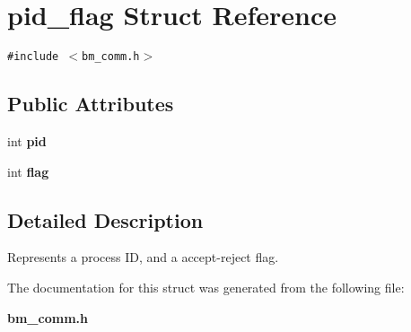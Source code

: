 \section{pid\_\-flag Struct Reference}
\label{structpid__flag}
{\tt \#include $<$bm\_\-comm.h$>$}

\subsection*{Public Attributes}
\begin{CompactItemize}
\item 
int {\bf pid}\label{structpid__flag_o0}

\item 
int {\bf flag}\label{structpid__flag_o1}

\end{CompactItemize}


\subsection{Detailed Description}
Represents a process ID, and a accept-reject flag. 



The documentation for this struct was generated from the following file:\begin{CompactItemize}
\item 
{\bf bm\_\-comm.h}\end{CompactItemize}
